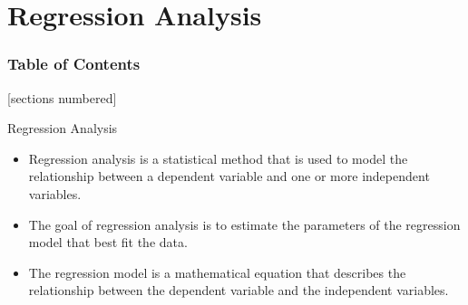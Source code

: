 \documentclass[serif, 9pt, aspectratio=32]{beamer}
\begin{document}
\section{Regression Analysis}

\begin{frame}
    \frametitle{Table of Contents}
    [sections numbered]
    \tableofcontents[currentsection]
\end{frame}

\begin{frame}{Regression Analysis}
    \begin{itemize}
        \item Regression analysis is a statistical method that is used to model the relationship between a dependent variable and one or more independent variables.
        \item The goal of regression analysis is to estimate the parameters of the regression model that best fit the data.
        \item The regression model is a mathematical equation that describes the relationship between the dependent variable and the independent variables.
    \end{itemize}
\end{frame}


\end{document}
